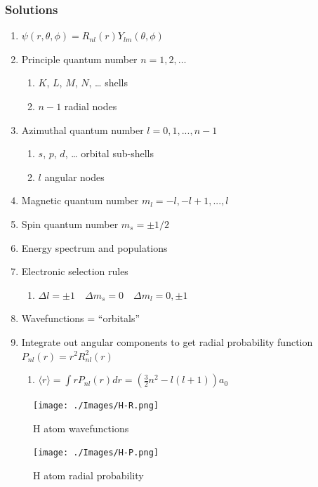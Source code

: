 \documentclass[11pt]{article}
\begin{document}
\subsubsection{Solutions}
\label{sec:org2a9654f}
\begin{enumerate}
\item \(\psi(r,\theta,\phi)=R_{nl}(r)Y_{lm}(\theta,\phi)\)
\item Principle quantum number \(n=1,2,\ldots\)
\begin{enumerate}
\item \(K\), \(L\), \(M\), \(N\), \ldots{} shells
\item \(n-1\) radial nodes
\end{enumerate}
\item Azimuthal quantum number \(l=0,1,...,n-1\)
\begin{enumerate}
\item \(s\), \(p\), \(d\), \ldots{} orbital sub-shells
\item \(l\) angular nodes
\end{enumerate}
\item Magnetic quantum number \(m_l=-l,-l+1,...,l\)
\item Spin quantum number \(m_s=\pm 1/2\)
\item Energy spectrum and populations
\item Electronic selection rules
\begin{enumerate}
\item \(\Delta l=\pm 1 \quad \Delta m_s =0 \quad \Delta m_l = 0,\pm 1\)
\end{enumerate}
\item Wavefunctions = ``orbitals''
\item Integrate out angular components to get radial probability function \(P_{nl}(r)=r^2 R_{nl}^2(r)\)
\begin{enumerate}
\item \(\langle r\rangle = \int r P_{nl}(r) dr = \left(\frac{3}{2}n^2-l(l+1)\right)a_0\)
\end{enumerate}
\end{enumerate}

\begin{figure}[htbp]
\centering
\texttt{[image: ./Images/H-R.png]}
\caption{H atom wavefunctions}
\end{figure} 
\begin{figure}[htbp]
\centering
\texttt{[image: ./Images/H-P.png]}
\caption{H atom radial probability}
\end{figure} 
\end{document}

